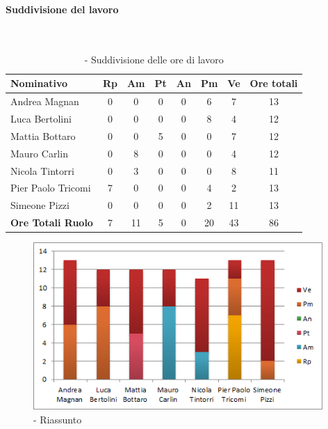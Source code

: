 \documentclass[./PianoDiProgetto.tex]{subfiles}
\begin{document}
\vspace{35mm}	
	
	
	\subsubsection{\PerV}
				\paragraph{Suddivisione del lavoro}\
					
	\begin{table}[H]
		\begin{tabularx}{\textwidth}{l  * {6}{c}  c}
			\toprule
			\textbf{Nominativo} & \textbf{Rp} & \textbf{Am} & \textbf{Pt} 
						& \textbf{An} & \textbf{Pm} & \textbf{Ve} & \textbf{Ore totali} \\
			\midrule
			Andrea Magnan  & 0 & 0 & 0 & 0 & 6 & 7 & 13 \\
			Luca Bertolini  & 0 & 0 & 0 & 0 & 8 & 4 & 12 \\
			Mattia Bottaro  & 0 & 0 & 5 & 0 & 0 & 7 & 12 \\
			Mauro Carlin  & 0 & 8 & 0 & 0 & 0 & 4 & 12 \\
			Nicola Tintorri  & 0 & 3 & 0 & 0 & 0 & 8 & 11 \\
			Pier Paolo Tricomi  & 7 & 0 & 0 & 0 & 4 & 2 & 13 \\
			Simeone Pizzi & 0 & 0 & 0 & 0 & 2 & 11 & 13 \\
			\midrule
			\textbf{Ore Totali Ruolo} & 7 & 11 & 5 & 0 & 20 & 43 & 86 \\
			\bottomrule
		\end{tabularx}
		\caption{\PerV{} - Suddivisione delle ore di lavoro}
	\end{table}
\vfill	

	
	\begin{figure}[H]
		\centering
		\includegraphics[width=11cm, trim=1cm 0cm 1cm 0cm]{grafici/V-persona}
			\caption{\PerV{} - Riassunto}
	\end{figure}
	
\end{document}
